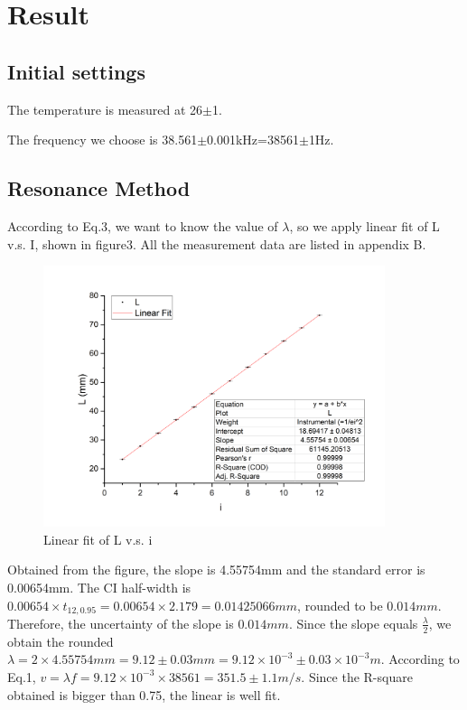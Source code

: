 \documentclass[12pt,a4paper]{article}
\begin{document}
\section{Result}
\subsection{Initial settings}
The temperature is measured at 26$\pm$1\textcelsius.\par 
The frequency we choose is 38.561$\pm$0.001kHz=38561$\pm$1Hz.

\subsection{Resonance Method}
According to Eq.3, we want to know the value of $\lambda$, so we apply linear fit of L v.s. I, shown in figure3. All the measurement data are listed in appendix B.
\begin{figure}[h]
    \centering
    \includegraphics[width=10cm]{method1.png}
    \caption{Linear fit of L v.s. i}
\end{figure} \par
Obtained from the figure, the slope is 4.55754mm and the standard error is 0.00654mm. The CI  half-width is $0.00654\times t_{12,0.95}=0.00654\times 2.179=0.01425066mm$, rounded to be $0.014mm$. Therefore, the uncertainty of the slope is $0.014mm$. Since the slope equals  $\frac{\lambda}{2}$, we obtain the rounded $\lambda =2\times 4.55754 mm=9.12\pm 0.03 mm=9.12\times 10^{-3}\pm 0.03\times 10^{-3}m$. According to Eq.1, $v=\lambda f=9.12\times 10^{-3}\times 38561=351.5\pm 1.1m/s$. Since the R-square obtained is bigger than 0.75, the linear is well fit.
\end{document}

